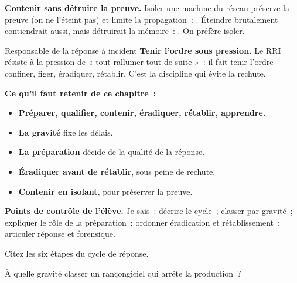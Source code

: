 \begin{boxCRO}
\textbf{Contenir sans détruire la preuve.} Isoler une machine du réseau
préserve la preuve (on ne l'éteint pas) et limite la propagation~:
\cro{+}{+}{+}. Éteindre brutalement contiendrait aussi, mais détruirait la
mémoire~: \cro{+}{-}{-}. On préfère isoler.
\end{boxCRO}

\begin{boxmetier}{Responsable de la réponse à incident}
\textbf{Tenir l'ordre sous pression.} Le RRI résiste à la pression de
« tout rallumer tout de suite »~: il fait tenir l'ordre confiner, figer,
éradiquer, rétablir. C'est la discipline qui évite la rechute.
\end{boxmetier}

\separateur

\begin{boxresume}
\textbf{Ce qu'il faut retenir de ce chapitre~:}
\begin{itemize}
    \item \textbf{Préparer, qualifier, contenir, éradiquer, rétablir,
          apprendre.}
    \item \textbf{La gravité} fixe les délais.
    \item \textbf{La préparation} décide de la qualité de la réponse.
    \item \textbf{Éradiquer avant de rétablir}, sous peine de rechute.
    \item \textbf{Contenir en isolant}, pour préserver la preuve.
\end{itemize}
\end{boxresume}

\begin{boxinfo}
\textbf{Points de contrôle de l'élève.} Je sais~: décrire le cycle~; classer
par gravité~; expliquer le rôle de la préparation~; ordonner éradication et
rétablissement~; articuler réponse et forensique.
\end{boxinfo}

\bigskip

\begin{boxexo}[title={\ding{45}\quad Exercice~15.1. Le cycle \niveaubase}]
Citez les six étapes du cycle de réponse.
\end{boxexo}

\begin{boxexo}[title={\ding{45}\quad Exercice~15.2. Gravité \niveaubase}]
À quelle gravité classer un rançongiciel qui arrête la production~?
\end{boxexo}

